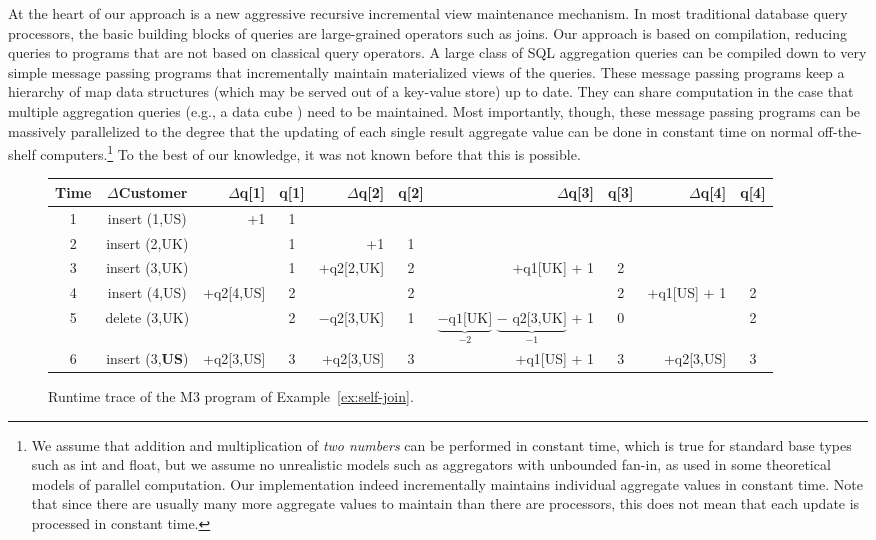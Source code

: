 At the heart of our approach is a new aggressive recursive
incremental view maintenance mechanism.
In most traditional database query processors, the  basic building blocks of
queries are large-grained operators such as joins.
Our approach is based on compilation, reducing
queries to programs that are not based on classical query operators.
A large class of
SQL aggregation queries can be compiled down to very simple message
passing programs that incrementally maintain materialized views of
the queries. These message passing programs keep a hierarchy of map data
structures (which may be served out of a key-value store) up to date.
They can share computation in the case that multiple aggregation queries (e.g.,
a data cube \cite{datacube}) need to be maintained.  Most importantly, though, these message
passing programs can be massively parallelized to the degree that the updating
of each single result aggregate value can be done in constant time on normal
off-the-shelf computers.\footnote{We assume that addition and multiplication
of {\em two numbers} can be performed in constant time, which is true for
%
%
standard base types such as int and float,
but we assume no unrealistic models such
as aggregators with unbounded fan-in, as used in some theoretical models of
parallel computation. Our implementation indeed incrementally maintains
individual aggregate values in constant time. Note that since there are
usually many more aggregate values to maintain than there are processors,
this does not mean that each update is processed in constant time.
}
To the best of our knowledge, it was not known before
that this is possible.


\begin{figure*}[!]
\begin{center}
\begin{tabular}{c|c|rc|rc|rc|rc}
Time & $\Delta$Customer
& $\Delta$q[1] & q[1]
& $\Delta$q[2] & q[2]
& $\Delta$q[3] & q[3]
& $\Delta$q[4] & q[4] \\
\hline
1&insert (1,US) &        +1 & 1 &             &   &             &   &&   \\
2&insert (2,UK) &           & 1 &          +1 & 1 &             &   &&   \\
3&insert (3,UK) &           & 1 &   +q2[2,UK] & 2 & +q1[UK] + 1 & 2 &&   \\
4&insert (4,US) & +q2[4,US] & 2 &             & 2 &             & 2 & +q1[US] + 1 & 2 \\
5&delete (3,UK) &           & 2 & $-$q2[3,UK] & 1 & $\underbrace{\mbox{$-$q1[UK]}}_{-2}$ $\underbrace{\mbox{$-$ q2[3,UK]}}_{-1}$ + 1 & 0 && 2 \\
6&insert (3,{\bf US}) & +q2[3,US] & 3 &   +q2[3,US] & 3 & +q1[US] + 1 & 3 & +q2[3,US] & 3  \\
\end{tabular}
\end{center}

\vspace{-4mm}

\caption{Runtime trace of the M3 program of Example~\ref{ex:self-join}.}
\label{fig:trace}
\end{figure*}


